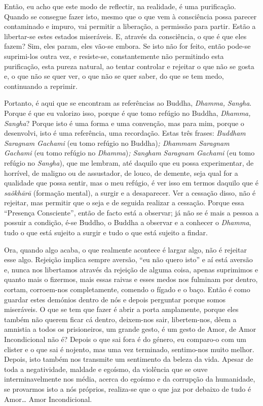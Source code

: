 Então, eu acho que este modo de reflectir, na realidade, é uma
purificação. Quando se consegue fazer isto, mesmo que o que vem à
consciência possa parecer contaminado e impuro, vai permitir a
liberação, a permissão para partir. Estão a libertar-se estes estados
miseráveis. E, através da consciência, o que é que eles fazem? Sim, eles
param, eles vão-se embora. Se isto não for feito, então pode-se
suprimi-los outra vez, e resiste-se, constantemente não permitindo esta
purificação, esta pureza natural, ao tentar controlar e rejeitar o que
não se gosta e, o que não se quer ver, o que não se quer saber, do que
se tem medo, continuando a reprimir.

Portanto, é aqui que se encontram as referências ao Buddha,
\emph{Dhamma,} \emph{Sangha}. Porque é que eu valorizo isso, porque é
que tomo refúgio no Buddha, \emph{Dhamma,} \emph{Sangha}? Porque isto é
uma forma e uma convenção, mas para mim, porque o desenvolvi, isto é uma
referência, uma recordação. Estas três frases: \emph{Buddham Saragnam
Gachami} (eu tomo refúgio no Buddha)\emph{; Dhammam Saragnam Gachami}
(eu tomo refúgio no \emph{Dhamma})\emph{; Sangham Saragnam Gachami} (eu
tomo refúgio no \emph{Sangha}), que me lembram, até daquilo que eu possa
experimentar, de horrível, de maligno ou de assustador, de louco, de
demente, seja qual for a qualidade que possa sentir, mas o meu refúgio,
é ver isso em termos daquilo que é \emph{saõkhārā} (formação mental), a
surgir e a desaparecer. Ver a cessação disso, não é rejeitar, mas
permitir que o seja e de seguida realizar a cessação. Porque essa
``Presença Consciente'', então de facto está a observar; já não se é
mais a pessoa a possuir a condição, é-se Buddho, o Buddha a observar e a
conhecer o \emph{Dhamma}, tudo o que está sujeito a surgir e tudo o que
está sujeito a findar.

Ora, quando algo acaba, o que realmente acontece é largar algo, não é
rejeitar esse algo. Rejeição implica sempre aversão, ``eu não quero
isto'' e aí está aversão e, nunca nos libertamos através da rejeição de
alguma coisa, apenas suprimimos e quanto mais o fizermos, mais essas
raivas e esses medos nos fulminam por dentro, cortam, corroem-nos
completamente, comendo o fígado e o baço. Então é como guardar estes
demónios dentro de nós e depois perguntar porque somos miseráveis. O que
se tem que fazer é abrir a porta amplamente, porque eles também não
querem ficar cá dentro, deixem-nos sair, libertem-nos, dêem a amnistia a
todos os prisioneiros, um grande gesto, é um gesto de Amor, de Amor
Incondicional não é? Depois o que sai fora é do género, eu comparo-o com
um clister e o que sai é nojento, mas uma vez terminado, sentimo-nos
muito melhor. Depois, isto também nos transmite um sentimento da beleza
da vida. Apesar de toda a negatividade, maldade e egoísmo, da violência
que se ouve interminavelmente nos média, acerca do egoísmo e da
corrupção da humanidade, se provarmos isto a nós próprios, realiza-se
que o que jaz por debaixo de tudo é Amor\ldots{} Amor Incondicional.

